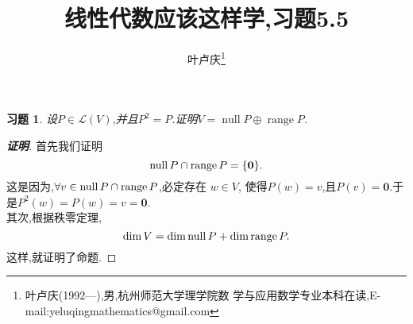 ﻿\documentclass[a4paper]{article}
\newtheorem*{exa}{习题}
\newenvironment{example}
{\bigskip\begin{mdframed}\begin{exa}}
    {\end{exa}\end{mdframed}\bigskip}
\begin{document}
\title{\huge{\bf{线性代数应该这样学,习题5.5}}}
\author{\small{叶卢庆\footnote{叶卢庆(1992---),男,杭州师范大学理学院数
      学与应用数学专业本科在读,E-mail:yeluqingmathematics@gmail.com}}}
\maketitle\ni
\begin{example}
设$P\in \mathcal{L}(V)$,并且$P^2=P$.证明$V=\operatorname{null}P\oplus
\operatorname{range}P$.
\end{example}
\begin{proof}[\textbf{证明}]
首先我们证明
$$
\operatorname{null}P\cap \operatorname{range}P=\{\mathbf{0}\}.
$$
这是因为,$\forall v\in \operatorname{null}P\cap \operatorname{range}P$,必定存在 $w\in V$,
使得$P(w)=v$,且$P(v)=\mathbf{0}$.于是$P^2(w)=P(w)=v=\mathbf{0}$.\\

\ni 其次,根据秩零定理,
$$
\dim V=\dim\operatorname{null}P+\dim\operatorname{range}P.
$$
这样,就证明了命题.
\end{proof}
\end{document}
